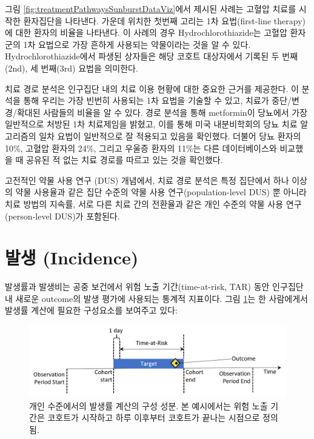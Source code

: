 \documentclass[11pt]{book}
\theoremstyle{definition}
\theoremstyle{definition}
\theoremstyle{definition}
\theoremstyle{remark}
\begin{document}
그림 \ref{fig:treatmentPathwaysSunburstDataViz}에서 제시된 사례는 고혈압
치료를 시작한 환자집단을 나타낸다. 가운데 위치한 첫번째 고리는 1차
요법(first-line therapy)에 대한 환자의 비율을 나타낸다. 이 사례의 경우
Hydrochlorothiazide는 고혈압 환자군의 1차 요법으로 가장 흔하게 사용되는
약물이라는 것을 알 수 있다. Hydrochlorothiazide에서 파생된 상자들은 해당
코호트 대상자에서 기록된 두 번째(2nd), 세 번째(3rd) 요법을 의미한다.

치료 경로 분석은 인구집단 내의 치료 이용 현황에 대한 중요한 근거를
제공한다. 이 분석을 통해 우리는 가장 빈번히 사용되는 1차 요법을 기술할
수 있고, 치료가 중단/변경/확대된 사람들의 비율을 알 수 있다. 경로 분석을
통해 metformin이 당뇨에서 가장 일반적으로 처방된 1차 치료제임을 밝혔고,
이를 통해 미국 내분비학회의 당뇨 치료 알고리즘의 일차 요법이 일반적으로
잘 적용되고 있음을 확인했다. 더불어 당뇨 환자의 10\%, 고혈압 환자의
24\%, 그리고 우울증 환자의 11\%는 다른 데이터베이스와 비교했을 때 공유된
적 없는 치료 경로를 따르고 있는 것을 확인했다.

고전적인 약물 사용 연구 (DUS) 개념에서, 치료 경로 분석은 특정 집단에서
하나 이상의 약물 사용율과 같은 집단 수준의 약물 사용
연구(population-level DUS) 뿐 아니라 치료 방법의 지속률, 서로 다른 치료
간의 전환율과 같은 개인 수준의 약물 사용 연구(person-level DUS)가
포함된다.

\section{발생 (Incidence)}\label{-incidence}

발생률과 발생비는 공중 보건에서 위험 노출 기간(time-at-risk, TAR) 동안
인구집단 내 새로운 outcome의 발생 평가에 사용되는 통계적 지표이다. 그림
\ref{fig:incidenceTimeline}는 한 사람에게서 발생률 계산에 필요한
구성요소를 보여주고 있다: 

\begin{figure}

{\centering \includegraphics[width=1\linewidth]{images/Characterization/incidenceTimeline} 

}

\caption{개인 수준에서의 발생률 계산의 구성 성분. 본 예시에서는 위험 노출 기간은 코호트가 시작하고 하루 이후부터 코호트가 끝나는 시점으로 정의됨.}\label{fig:incidenceTimeline}
\end{figure}
\end{document}
